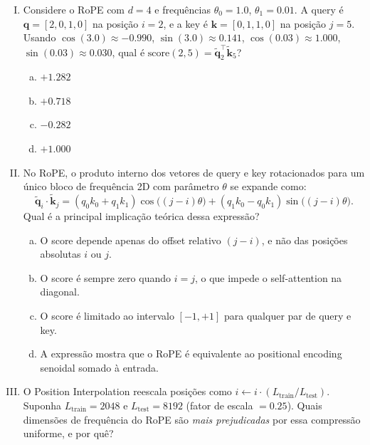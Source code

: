 \documentclass{dlproblemset}
\begin{document}
\begin{enumerate}[I)]
\item {} Considere o RoPE com $d = 4$ e frequências $\theta_0 = 1.0$,
      $\theta_1 = 0.01$. A query é $\mathbf{q} = [2, 0, 1, 0]$ na posição $i = 2$,
      e a key é $\mathbf{k} = [0, 1, 1, 0]$ na posição $j = 5$.
      Usando $\cos(3.0) \approx -0.990$, $\sin(3.0) \approx 0.141$,
      $\cos(0.03) \approx 1.000$, $\sin(0.03) \approx 0.030$, qual é
      $\mathrm{score}(2, 5) = \tilde{\mathbf{q}}_2^\top \tilde{\mathbf{k}}_5$?

\begin{enumerate}[a)]
    \item $+1.282$
    \item $+0.718$
    \item $-0.282$
    \item $+1.000$
\end{enumerate}

\item {} No RoPE, o produto interno dos vetores de query e key rotacionados para um único bloco de frequência 2D com parâmetro $\theta$ se expande como:
      \[
        \tilde{\mathbf{q}}_i \cdot \tilde{\mathbf{k}}_j
        = (q_0 k_0 + q_1 k_1)\cos\!\bigl((j-i)\theta\bigr)
          + (q_1 k_0 - q_0 k_1)\sin\!\bigl((j-i)\theta\bigr).
      \]
      Qual é a principal implicação teórica dessa expressão?

\begin{enumerate}[a)]
    \item O score depende apenas do offset relativo $(j - i)$, e não das posições
          absolutas $i$ ou $j$.
    \item O score é sempre zero quando $i = j$, o que impede o self-attention
          na diagonal.
    \item O score é limitado ao intervalo $[-1, +1]$ para qualquer par de query
          e key.
    \item A expressão mostra que o RoPE é equivalente ao positional encoding senoidal
          somado à entrada.
\end{enumerate}

\item {} O Position Interpolation reescala posições como
      $i \leftarrow i \cdot (L_{\mathrm{train}} / L_{\mathrm{test}})$.
      Suponha $L_{\mathrm{train}} = 2048$ e $L_{\mathrm{test}} = 8192$
      (fator de escala $= 0.25$). Quais dimensões de frequência do RoPE são
      \emph{mais prejudicadas} por essa compressão uniforme, e por quê?


\end{enumerate}
\end{document}
